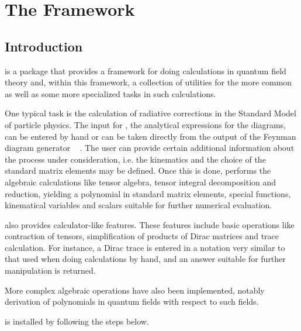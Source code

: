 \chapter{The \fc Framework}

\section{Introduction}
\label{intro}

\fc is a \mma package that provides a framework for doing calculations
in quantum field theory and, within this framework, a collection of utilities
for the more common as well as some more specialized tasks
in such calculations.

One typical task is the calculation of
radiative corrections in the Standard Model of particle physics. 
The input for \fc, the analytical expressions for the diagrams, can be 
entered by hand or can be taken directly from the output of the Feynman diagram generator \fa\ \cite{feynarts} .
The user can provide certain additional  information about the process 
under consideration, i.e. the kinematics and the choice of the standard 
matrix elements may be defined. Once this is done, \fc performs the 
algebraic calculations like tensor algebra, tensor integral decomposition and reduction,
yielding a polynomial in standard matrix elements,  special functions, kinematical 
variables and scalars suitable for further numerical evaluation.

\fc also provides calculator-like features.
These features include basic operations like contraction of
tensors, simplification of products of Dirac matrices and trace calculation.
For instance, a Dirac trace is entered
in a notation very similar to that used when doing calculations by hand, and 
an answer suitable for further manipulation is returned.

More complex algebraic operations have also been implemented, notably derivation
of polynomials in quantum fields with respect to such fields.

\fc is installed by following the steps below.

